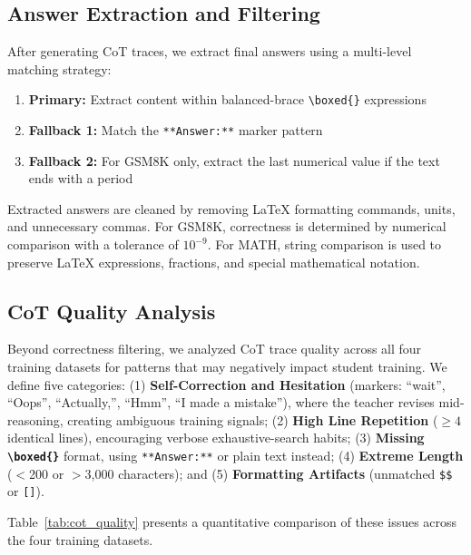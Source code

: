 \documentclass{article}
\begin{document}
\subsection{Answer Extraction and Filtering}

After generating CoT traces, we extract final answers using a multi-level matching strategy:
\begin{enumerate}[leftmargin=*]
    \item \textbf{Primary:} Extract content within balanced-brace \texttt{\textbackslash{}boxed\{\}} expressions
    \item \textbf{Fallback 1:} Match the \verb|**Answer:**| marker pattern
    \item \textbf{Fallback 2:} For GSM8K only, extract the last numerical value if the text ends with a period
\end{enumerate}

Extracted answers are cleaned by removing LaTeX formatting commands, units, and unnecessary commas. For GSM8K, correctness is determined by numerical comparison with a tolerance of $10^{-9}$. For MATH, string comparison is used to preserve LaTeX expressions, fractions, and special mathematical notation.

\subsection{CoT Quality Analysis}

Beyond correctness filtering, we analyzed CoT trace quality across all four training datasets for patterns that may negatively impact student training. We define five categories: (1) \textbf{Self-Correction and Hesitation} (markers: ``wait'', ``Oops'', ``Actually,'', ``Hmm'', ``I made a mistake''), where the teacher revises mid-reasoning, creating ambiguous training signals; (2) \textbf{High Line Repetition} ($\geq 4$ identical lines), encouraging verbose exhaustive-search habits; (3) \textbf{Missing \texttt{\textbackslash{}boxed\{\}}} format, using \texttt{**Answer:**} or plain text instead; (4) \textbf{Extreme Length} ($<$200 or $>$3,000 characters); and (5) \textbf{Formatting Artifacts} (unmatched \texttt{\$\$} or \texttt{[]}).

Table~\ref{tab:cot_quality} presents a quantitative comparison of these issues across the four training datasets.
\end{document}
